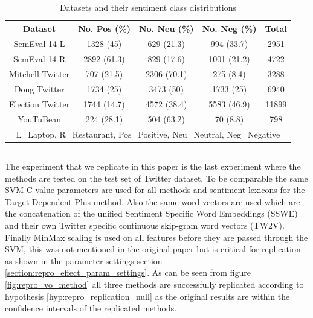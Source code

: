 \begin{table}[]
    \centering
    \begin{tabular}{|c|c|c|c|c|}
        \hline
        Dataset & No. Pos (\%) & No. Neu (\%) & No. Neg (\%) & Total\\
        \hline
        SemEval 14 L & 1328 (45) & 629 (21.3) & 994 (33.7) & 2951 \\
        \hline
        SemEval 14 R & 2892 (61.3) & 829 (17.6) & 1001 (21.2) & 4722 \\
        \hline
        Mitchell Twitter & 707 (21.5) & 2306 (70.1) & 275 (8.4) & 3288 \\
        \hline
        Dong Twitter & 1734 (25) & 3473 (50) & 1733 (25) & 6940 \\
        \hline 
        Election Twitter & 1744 (14.7) & 4572 (38.4) & 5583 (46.9) & 11899 \\
        \hline 
        YouTuBean & 224 (28.1) & 504 (63.2) & 70 (8.8) & 798 \\
        \hline
        \multicolumn{5}{|p{\linewidth}|}{L=Laptop, R=Restaurant, Pos=Positive, Neu=Neutral, Neg=Negative}\\
        \hline
    \end{tabular}
    \caption{Datasets and their sentiment class distributions}
    \label{table:repro_dataset_sent_dist}
\end{table}

\subsection{\cite{vo2015target}}
The experiment that we replicate in this paper is the last experiment where the methods are tested on the test set of \citet{dong-etal-2014-adaptive} Twitter dataset. To be comparable the same SVM C-value parameters are used for all methods and sentiment lexicons for the Target-Dependent Plus method. Also the same word vectors are used which are the concatenation of the unified Sentiment Specific Word Embeddings (SSWE) \citep{tang-etal-2014-learning} and their own Twitter specific continuous skip-gram \citep{mikolov2013efficient} word vectors (TW2V). Finally MinMax scaling is used on all features before they are passed through the SVM, this was not mentioned in the original paper but is critical for replication as shown in the parameter settings section \ref{section:repro_effect_param_settings}. As can be seen from figure \ref{fig:repro_vo_method} all three methods are successfully replicated according to hypothesis \ref{hyp:repro_replication_null} as the original results are within the confidence intervals of the replicated methods.

